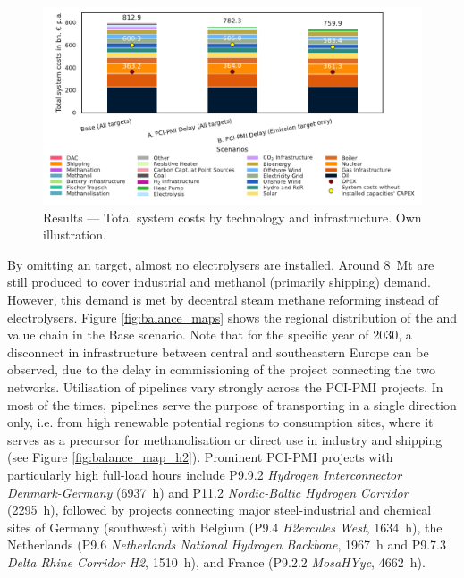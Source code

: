 \documentclass[10pt]{article}
\begin{document}
\begin{figure}[!htbp]
    \centering
    \includegraphics[width=1\textwidth]{system_costs}
    \caption{Results --- Total system costs by technology and infrastructure. Own illustration.}
    \label{fig:system_costs}
\end{figure}

By omitting an  target, almost no electrolysers are installed. Around \SI{8}{Mt} are still produced to cover industrial  and methanol (primarily shipping) demand. However, this demand is met by decentral steam methane reforming instead of electrolysers. 
Figure \ref{fig:balance_maps} shows the regional distribution of the  and  value chain in the Base scenario. Note that for the specific year of 2030, a disconnect in  infrastructure between central and southeastern Europe can be observed, due to the delay in commissioning of the project connecting the two networks. Utilisation of  pipelines vary strongly across the PCI-PMI projects. In most of the times, pipelines serve the purpose of transporting  in a single direction only, i.e. from high renewable potential regions to  consumption sites, where it serves as a precursor for methanolisation or direct use in industry and shipping (see Figure \ref{fig:balance_map_h2}). Prominent PCI-PMI projects with particularly high full-load hours include P9.9.2 \textit{Hydrogen Interconnector Denmark-Germany} (\SI{6937}{h}) and P11.2  \textit{Nordic-Baltic Hydrogen Corridor} (\SI{2295}{h}), followed by projects connecting major steel-industrial and chemical sites of Germany (southwest) with Belgium (P9.4 \textit{H2ercules West}, \SI{1634}{h}), the Netherlands (P9.6 \textit{Netherlands National Hydrogen Backbone}, \SI{1967}{h} and P9.7.3 \textit{Delta Rhine Corridor H2}, \SI{1510}{h}), and France (P9.2.2 \textit{MosaHYyc}, \SI{4662}{h}).
\end{document}
